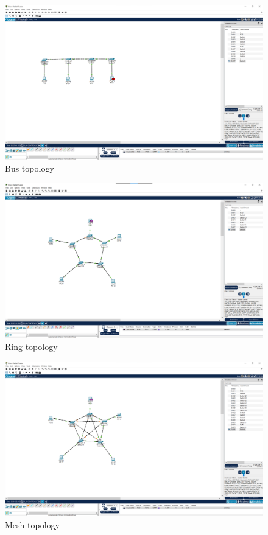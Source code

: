 \documentclass[12pt]{article}
\begin{document}
\begin{figure}[h] %
\centering
\includegraphics[width=\textwidth]{bus.png}
\caption{Bus topology}
\end{figure}
\begin{figure}[h] %
\centering
\includegraphics[width=\textwidth]{ring.png}
\caption{Ring topology}
\end{figure}
\begin{figure}[h] %
\centering
\includegraphics[width=\textwidth]{mesh.png}
\caption{Mesh topology}
\end{figure}
\end{document}
